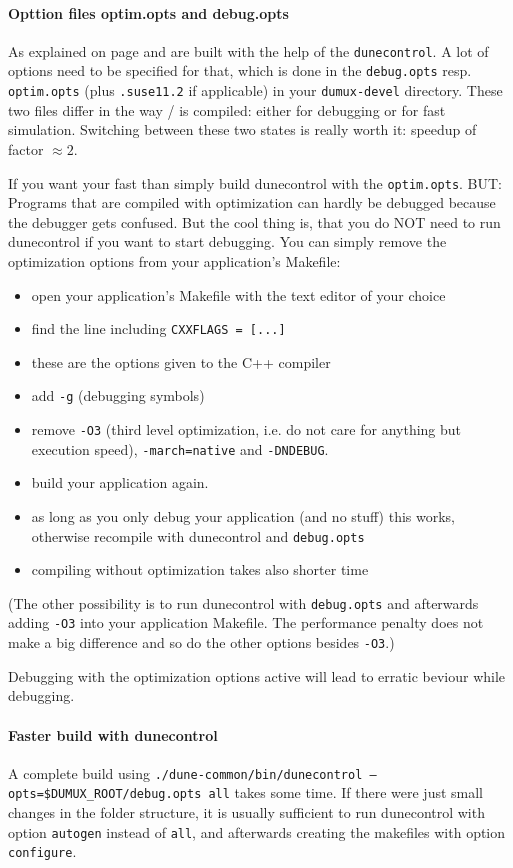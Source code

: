 \paragraph{Opttion files optim.opts and debug.opts}

As explained on page \pageref{buildIt} \Dune and \Dumux are built with the help of the \texttt{dunecontrol}. 
A lot of options need to be specified for that, which is done in the \verb+debug.opts+ resp. \verb+optim.opts+ 
(plus \verb+.suse11.2+ if applicable) in your \verb+dumux-devel+ directory. These two files differ in the way \Dune / \Dumux is compiled: either for debugging or for fast simulation. Switching between these two states is really 
worth it: speedup of factor $\approx 2$. 

If you want your \Dumux fast than simply build dunecontrol with the \verb+optim.opts+. BUT: Programs that are compiled with optimization can hardly 
be debugged because the debugger gets confused. But the cool thing is, that you do NOT need to run dunecontrol if you want to start debugging. You can simply remove the optimization options from your application's Makefile:
\begin{itemize}
\item open your application's Makefile with the text editor of your choice
\item find the line including \verb+CXXFLAGS = [...]+
\item these are the options given to the C++ compiler
\item add \verb+-g+ (debugging symbols)
\item remove  \verb+-O3+ (third level optimization, i.e. do not care for anything but execution speed),  \verb+-march=native+ and \verb+-DNDEBUG+.
\item build your application again. 
\item as long as you only debug your application (and no \Dune stuff) this works, otherwise recompile with dunecontrol and \verb+debug.opts+
\item compiling without optimization takes also shorter time
\end{itemize}

(The other possibility is to run dunecontrol with \verb+debug.opts+ and afterwards adding \verb+-O3+ into your application Makefile. The performance  penalty does not make a big difference and so do the other options besides \verb+-O3+.)

Debugging with the optimization options active will lead to erratic beviour while debugging. 

\paragraph{Faster build with dunecontrol}
A complete build using \texttt{./dune-common/bin/dunecontrol --opts=\$DUMUX\_ROOT/debug.opts all} takes some time. If there were just small changes in the folder structure, it is usually sufficient to run dunecontrol with option \texttt{autogen} instead of \texttt{all}, and afterwards creating the makefiles with option \texttt{configure}.

